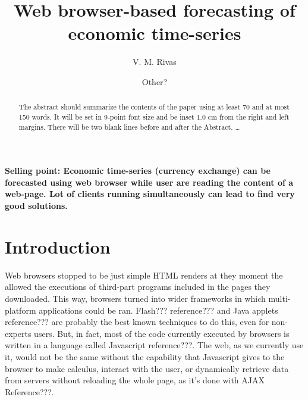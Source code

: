 \documentclass{llncs}
\begin{document}
%
%
\mainmatter              %
%
\title{Web browser-based forecasting of economic time-series}
%
%
\author{
V. M. Rivas 
\and Other?
}
%
%
%

\maketitle              %
\textbf{Selling point: Economic time-series (currency exchange) can be forecasted using web browser while user are reading the content of a web-page. Lot of clients running simultaneously can lead to find very good solutions.}
\begin{abstract}
{\color{red}
The abstract should summarize the contents of the paper
using at least 70 and at most 150 words. It will be set in 9-point
font size and be inset 1.0 cm from the right and left margins.
There will be two blank lines before and after the Abstract. \dots
}
\end{abstract}
%
\section{Introduction}
Web browsers stopped to be just simple HTML renders at they moment the allowed the executions of third-part programs included in the pages they downloaded. This way, browsers turned into wider frameworks in which multi-platform applications could be ran. Flash??? reference??? and Java applets reference??? are probably the best known techniques to do this, even for non-experts users. But, in fact, most of the code currently executed by browsers is written in a language called Javascript reference???. The web, as we currently use it, would not be the same without the capability that Javascript gives to the browser to make calculus, interact with the user, or dynamically retrieve data from servers without reloading the whole page, as it's done with AJAX Reference???. 
\end{document}

